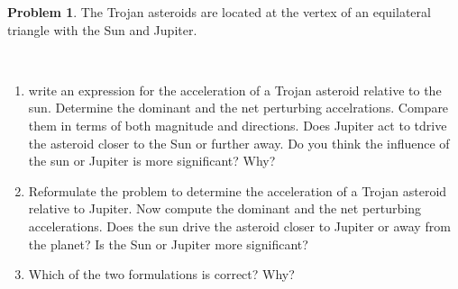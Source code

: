\documentclass[10pt]{article}
\theoremstyle{definition}
\newtheorem{prob}{Problem}[section]
\newenvironment{subprob}%
{\renewcommand{\theenumi}{\alph{enumi}}\renewcommand{\labelenumi}{(\theenumi)}\begin{enumerate}}%
{\end{enumerate}}%
\begin{document}
\begin{prob}
    The Trojan asteroids are located at the vertex of an equilateral triangle with the Sun and Jupiter.
    \begin{figure}
        \centering
        ~
    \end{figure}

    \begin{subprob}
        \item write an expression for the acceleration of a Trojan asteroid relative to the sun. 
            Determine the dominant and the net perturbing accelrations.
            Compare them in terms of both magnitude and directions.
            Does Jupiter act to tdrive the asteroid closer to the Sun or further away.
            Do you think the influence of the sun or Jupiter is more significant?
            Why?
        \item Reformulate the problem to determine the acceleration of a Trojan asteroid relative to Jupiter.
            Now compute the dominant and the net perturbing accelerations. 
            Does the sun drive the asteroid closer to Jupiter or away from the planet?
            Is the Sun or Jupiter more significant?
        \item Which of the two formulations is correct?
            Why?
    \end{subprob}
\end{prob}
\end{document}
